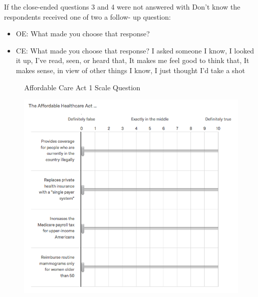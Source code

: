 If the close-ended questions 3 and 4 were not answered with Don’t know the respondents received one of two a follow- up question:
\begin{itemize}
	\item OE: What made you choose that response?
	\item CE: What made you choose that response? I asked someone I know, I looked it up, I’ve read, seen, or heard that, It makes me feel good to think that, It makes sense, in view of other things I know, I just thought I’d take a shot
\end{itemize}

\begin{center}
	\begin{figure}[H]
		\centering
		\caption{Affordable Care Act 1 Scale Question}
		\includegraphics[width=\textwidth]{../figs/hk_aca1.png}
		\label{fig:aca1}
		\caption*{\footnotesize }
	\end{figure}
\end{center}



